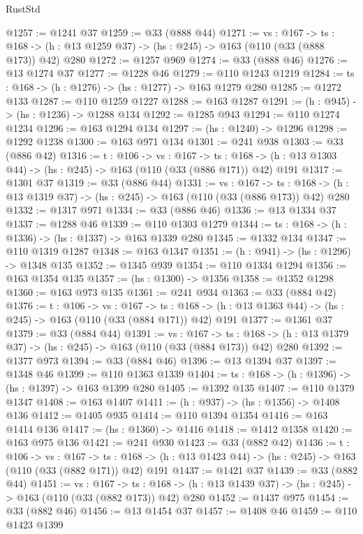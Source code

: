 \begin{lexlean}{RustStd}
\begin{coremodule}
{\begin{coremodule}
{{{@1257 := @1241 @37
@1259 := @33 (@888 @44)
@1271 := {vs : @167} ->
  {ts : @168} -> (h : @13 @1259 @37) -> (hs : @245) -> @163 (@110 (@33 (@888 @173)) @42) @280
@1272 := @1257 @969
@1274 := @33 (@888 @46)
@1276 := @13 @1274 @37
@1277 := @1228 @46
@1279 := @110 @1243 @1219
@1284 := {ts : @168} -> (h : @1276) -> (hs : @1277) -> @163 @1279 @280
@1285 := @1272 @133
@1287 := @110 @1259 @1227
@1288 := @163 @1287
@1291 := (h : @945) -> (hs : @1236) -> @1288 @134
@1292 := @1285 @943
@1294 := @110 @1274 @1234
@1296 := @163 @1294 @134
@1297 := (hs : @1240) -> @1296
@1298 := @1292 @1238
@1300 := @163 @971 @134
@1301 := @241 @938
@1303 := @33 (@886 @42)
@1316 := {t : @106} ->
  {vs : @167} ->
  {ts : @168} -> (h : @13 @1303 @44) -> (hs : @245) -> @163 (@110 (@33 (@886 @171)) @42) @191
@1317 := @1301 @37
@1319 := @33 (@886 @44)
@1331 := {vs : @167} ->
  {ts : @168} -> (h : @13 @1319 @37) -> (hs : @245) -> @163 (@110 (@33 (@886 @173)) @42) @280
@1332 := @1317 @971
@1334 := @33 (@886 @46)
@1336 := @13 @1334 @37
@1337 := @1288 @46
@1339 := @110 @1303 @1279
@1344 := {ts : @168} -> (h : @1336) -> (hs : @1337) -> @163 @1339 @280
@1345 := @1332 @134
@1347 := @110 @1319 @1287
@1348 := @163 @1347
@1351 := (h : @941) -> (hs : @1296) -> @1348 @135
@1352 := @1345 @939
@1354 := @110 @1334 @1294
@1356 := @163 @1354 @135
@1357 := (hs : @1300) -> @1356
@1358 := @1352 @1298
@1360 := @163 @973 @135
@1361 := @241 @934
@1363 := @33 (@884 @42)
@1376 := {t : @106} ->
  {vs : @167} ->
  {ts : @168} -> (h : @13 @1363 @44) -> (hs : @245) -> @163 (@110 (@33 (@884 @171)) @42) @191
@1377 := @1361 @37
@1379 := @33 (@884 @44)
@1391 := {vs : @167} ->
  {ts : @168} -> (h : @13 @1379 @37) -> (hs : @245) -> @163 (@110 (@33 (@884 @173)) @42) @280
@1392 := @1377 @973
@1394 := @33 (@884 @46)
@1396 := @13 @1394 @37
@1397 := @1348 @46
@1399 := @110 @1363 @1339
@1404 := {ts : @168} -> (h : @1396) -> (hs : @1397) -> @163 @1399 @280
@1405 := @1392 @135
@1407 := @110 @1379 @1347
@1408 := @163 @1407
@1411 := (h : @937) -> (hs : @1356) -> @1408 @136
@1412 := @1405 @935
@1414 := @110 @1394 @1354
@1416 := @163 @1414 @136
@1417 := (hs : @1360) -> @1416
@1418 := @1412 @1358
@1420 := @163 @975 @136
@1421 := @241 @930
@1423 := @33 (@882 @42)
@1436 := {t : @106} ->
  {vs : @167} ->
  {ts : @168} -> (h : @13 @1423 @44) -> (hs : @245) -> @163 (@110 (@33 (@882 @171)) @42) @191
@1437 := @1421 @37
@1439 := @33 (@882 @44)
@1451 := {vs : @167} ->
  {ts : @168} -> (h : @13 @1439 @37) -> (hs : @245) -> @163 (@110 (@33 (@882 @173)) @42) @280
@1452 := @1437 @975
@1454 := @33 (@882 @46)
@1456 := @13 @1454 @37
@1457 := @1408 @46
@1459 := @110 @1423 @1399
}}}
\end{coremodule}}
\end{coremodule}
\end{lexlean}
